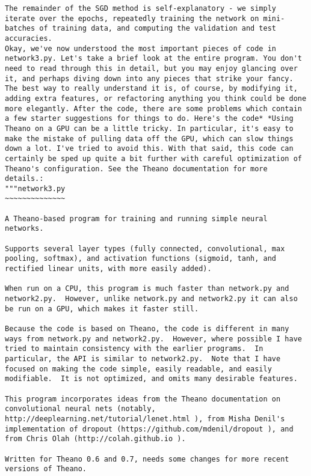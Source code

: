 \begin{lstlisting}
The remainder of the SGD method is self-explanatory - we simply iterate over the epochs, repeatedly training the network on mini-batches of training data, and computing the validation and test accuracies. 
Okay, we've now understood the most important pieces of code in network3.py. Let's take a brief look at the entire program. You don't need to read through this in detail, but you may enjoy glancing over it, and perhaps diving down into any pieces that strike your fancy. The best way to really understand it is, of course, by modifying it, adding extra features, or refactoring anything you think could be done more elegantly. After the code, there are some problems which contain a few starter suggestions for things to do. Here's the code* *Using Theano on a GPU can be a little tricky. In particular, it's easy to make the mistake of pulling data off the GPU, which can slow things down a lot. I've tried to avoid this. With that said, this code can certainly be sped up quite a bit further with careful optimization of Theano's configuration. See the Theano documentation for more details.:
"""network3.py
~~~~~~~~~~~~~~

A Theano-based program for training and running simple neural
networks.

Supports several layer types (fully connected, convolutional, max
pooling, softmax), and activation functions (sigmoid, tanh, and
rectified linear units, with more easily added).

When run on a CPU, this program is much faster than network.py and
network2.py.  However, unlike network.py and network2.py it can also
be run on a GPU, which makes it faster still.

Because the code is based on Theano, the code is different in many
ways from network.py and network2.py.  However, where possible I have
tried to maintain consistency with the earlier programs.  In
particular, the API is similar to network2.py.  Note that I have
focused on making the code simple, easily readable, and easily
modifiable.  It is not optimized, and omits many desirable features.

This program incorporates ideas from the Theano documentation on
convolutional neural nets (notably,
http://deeplearning.net/tutorial/lenet.html ), from Misha Denil's
implementation of dropout (https://github.com/mdenil/dropout ), and
from Chris Olah (http://colah.github.io ).

Written for Theano 0.6 and 0.7, needs some changes for more recent
versions of Theano.


\end{lstlisting}
